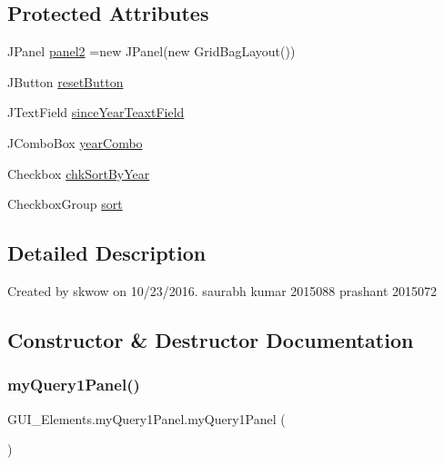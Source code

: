 \subsection*{Protected Attributes}
\begin{DoxyCompactItemize}
\item 
J\+Panel \hyperlink{class_g_u_i___elements_1_1my_query1_panel_ab923a9c569a07cdb10332b944e871903}{panel2} =new J\+Panel(new Grid\+Bag\+Layout())
\item 
J\+Button \hyperlink{class_g_u_i___elements_1_1my_query1_panel_a258a18ffc0a0a2614b3029be4765a067}{reset\+Button}
\item 
J\+Text\+Field \hyperlink{class_g_u_i___elements_1_1my_query1_panel_a960fb72a45e85925b931852ce4b218eb}{since\+Year\+Teaxt\+Field}
\item 
J\+Combo\+Box \hyperlink{class_g_u_i___elements_1_1my_query1_panel_a8327a7218462c60f0b0b9eeed6ba392c}{year\+Combo}
\item 
Checkbox \hyperlink{class_g_u_i___elements_1_1my_query1_panel_a021a96e74cad421c5dda3f8b98e3feb6}{chk\+Sort\+By\+Year}
\item 
Checkbox\+Group \hyperlink{class_g_u_i___elements_1_1my_query1_panel_a349792b04363355dc174bfbad3ac6422}{sort}
\end{DoxyCompactItemize}


\subsection{Detailed Description}
Created by skwow on 10/23/2016. saurabh kumar 2015088 prashant 2015072 

\subsection{Constructor \& Destructor Documentation}
\hypertarget{class_g_u_i___elements_1_1my_query1_panel_a327650227b1692cbbc2f8ef90a133afc}{}\label{class_g_u_i___elements_1_1my_query1_panel_a327650227b1692cbbc2f8ef90a133afc} 
\subsubsection{\texorpdfstring{my\+Query1\+Panel()}{myQuery1Panel()}}
{\footnotesize\ttfamily G\+U\+I\+\_\+\+Elements.\+my\+Query1\+Panel.\+my\+Query1\+Panel (\begin{DoxyParamCaption}{ }\end{DoxyParamCaption})}



